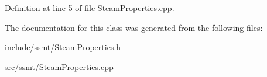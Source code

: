Definition at line 5 of file Steam\+Properties.\+cpp.



The documentation for this class was generated from the following files\+:\begin{DoxyCompactItemize}
\item 
include/ssmt/Steam\+Properties.\+h\item 
src/ssmt/Steam\+Properties.\+cpp\end{DoxyCompactItemize}

